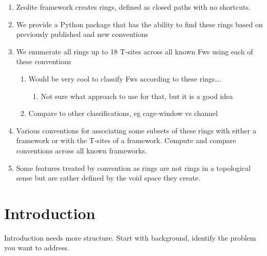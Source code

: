 \documentclass[11pt]{article}
\begin{document}
\begin{enumerate}
\item Zeolite framework creates rings, defined as closed paths with no shortcuts.
\item We provide a Python package that has the ability to find these rings based on previously published and new conventions
\item We enumerate all rings up to 18 T-sites across all known Fws using each of these conventions
\begin{enumerate}
\item Would be very cool to classify Fws according to these rings\ldots{}.
\begin{enumerate}
\item Not sure what approach to use for that, but it is a good idea
\end{enumerate}
\item Compare to other classifications, eg cage-window vs channel
\end{enumerate}
\item Various conventions for associating some subsets of these rings with either a framework or with the T-sites of a framework. Compute and compare conventions across all known frameworks.
\item Some features treated by convention as rings are not rings in a topological sense but are rather defined by the void space they create.
\end{enumerate}

\section*{Introduction}
\label{sec:orge351f77}
Introduction needs more structure.  Start with background, identify the problem you want to address.
\end{document}
